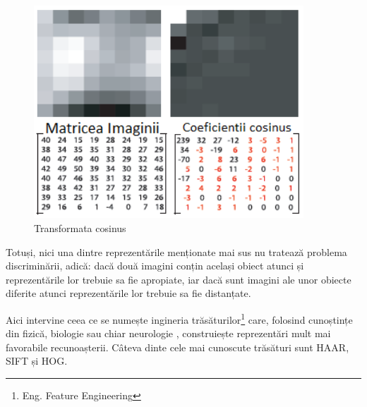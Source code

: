 \begin{figure}[H]
	\centering
		\includegraphics[width=0.90\textwidth]{imagini/take_DCT.png}
	\caption{Transformata cosinus\protect\footnotemark}
	\label{fig:take_DCT}
\end{figure}


Totuși, nici una dintre reprezentările menționate mai sus nu tratează problema discriminării, adică: dacă două imagini conțin același obiect atunci și reprezentările lor trebuie sa fie apropiate, iar dacă sunt imagini ale unor obiecte diferite atunci reprezentările lor trebuie sa fie distanțate.

Aici intervine ceea ce se numește ingineria trăsăturilor\footnote{Eng. Feature Engineering} care, folosind cunoștințe din fizică, biologie sau chiar neurologie , construiește reprezentări mult mai favorabile recunoașterii.
Câteva dinte cele mai cunoscute trăsături sunt HAAR\cite{Viola01robustreal-time}, SIFT\cite{Lowe99objectrecognition} și HOG\cite{Dalal05histogramsof}.

